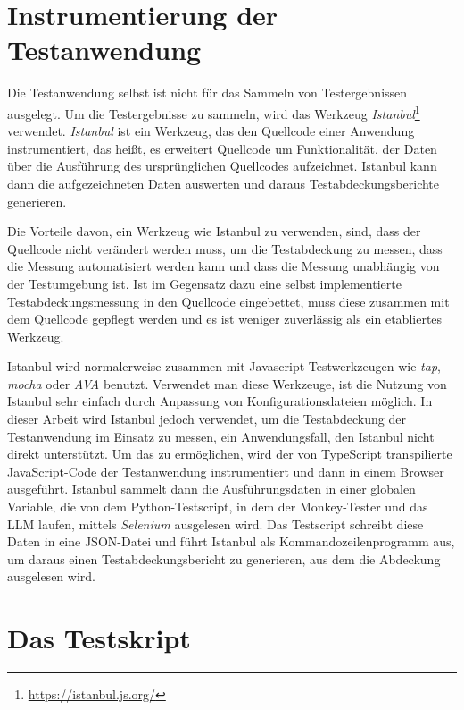 \section{Instrumentierung der Testanwendung}

Die Testanwendung selbst ist nicht für das Sammeln von Testergebnissen ausgelegt.
Um die Testergebnisse zu sammeln, wird das Werkzeug \textit{Istanbul}\footnote{\url{https://istanbul.js.org/}} verwendet.
\textit{Istanbul} ist ein Werkzeug, das den Quellcode einer Anwendung instrumentiert, das heißt, es erweitert Quellcode um Funktionalität, der Daten über die Ausführung des ursprünglichen Quellcodes aufzeichnet.
Istanbul kann dann die aufgezeichneten Daten auswerten und daraus Testabdeckungsberichte generieren.

Die Vorteile davon, ein Werkzeug wie Istanbul zu verwenden, sind, dass der Quellcode nicht verändert werden muss, um die Testabdeckung zu messen, dass die Messung automatisiert werden kann und dass die Messung unabhängig von der Testumgebung ist.
Ist im Gegensatz dazu eine selbst implementierte Testabdeckungsmessung in den Quellcode eingebettet, muss diese zusammen mit dem Quellcode gepflegt werden und es ist weniger zuverlässig als ein etabliertes Werkzeug.

Istanbul wird normalerweise zusammen mit Javascript-Testwerkzeugen wie \textit{tap}, \textit{mocha} oder \textit{AVA} benutzt.
Verwendet man diese Werkzeuge, ist die Nutzung von Istanbul sehr einfach durch Anpassung von Konfigurationsdateien möglich.
In dieser Arbeit wird Istanbul jedoch verwendet, um die Testabdeckung der Testanwendung im Einsatz zu messen, ein Anwendungsfall, den Istanbul nicht direkt unterstützt.
Um das zu ermöglichen, wird der von TypeScript transpilierte JavaScript-Code der Testanwendung instrumentiert und dann in einem Browser ausgeführt.
Istanbul sammelt dann die Ausführungsdaten in einer globalen Variable, die von dem Python-Testscript, in dem der Monkey-Tester und das LLM laufen, mittels \textit{Selenium} ausgelesen wird.
Das Testscript schreibt diese Daten in eine JSON-Datei und führt Istanbul als Kommandozeilenprogramm aus, um daraus einen Testabdeckungsbericht zu generieren, aus dem die Abdeckung ausgelesen wird.

\section{Das Testskript}

